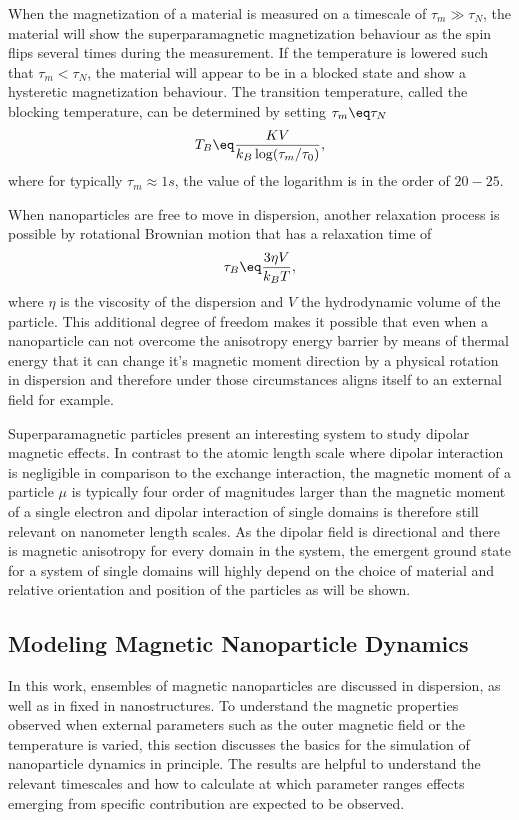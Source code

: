 \documentclass[\main/dresen_thesis.tex]{subfiles}
\begin{document}
    When the magnetization of a material is measured on a timescale of $\tau_m \gg \tau_N$, the material will show the superparamagnetic magnetization behaviour as the spin flips several times during the measurement.
    If the temperature is lowered such that $\tau_m < \tau_N$, the material will appear to be in a blocked state and show a hysteretic magnetization behaviour.
    The transition temperature, called the blocking temperature, can be determined by setting $\tau_m \eq \tau_N$
    \begin{align}
      T_B \eq \frac{KV}{k_B \log(\tau_m/\tau_0)},
    \end{align}
    where for typically $\tau_m \approx 1 \unit{s}$, the value of the logarithm is in the order of $20 - 25$.

    When nanoparticles are free to move in dispersion, another relaxation process is possible by rotational Brownian motion that has a relaxation time of \cite{Einstein_1956_Inves}
    \begin{align}
      \tau_B \eq \frac{3 \eta V}{k_B T},
    \end{align}
    where $\eta$ is the viscosity of the dispersion and $V$ the hydrodynamic volume of the particle.
    This additional degree of freedom makes it possible that even when a nanoparticle can not overcome the anisotropy energy barrier by means of thermal energy that it can change it's magnetic moment direction by a physical rotation in dispersion and therefore under those circumstances aligns itself to an external field for example.

    Superparamagnetic particles present an interesting system to study dipolar magnetic effects.
    In contrast to the atomic length scale where dipolar interaction is negligible in comparison to the exchange interaction, the magnetic moment of a particle $\mu$ is typically four order of magnitudes larger than the magnetic moment of a single electron and dipolar interaction of single domains is therefore still relevant on nanometer length scales.
    As the dipolar field is directional and there is magnetic anisotropy for every domain in the system, the emergent ground state for a system of single domains will highly depend on the choice of material and relative orientation and position of the particles as will be shown.

  \subsection{Modeling Magnetic Nanoparticle Dynamics}
    In this work, ensembles of magnetic nanoparticles are discussed in dispersion, as well as in fixed in nanostructures.
    To understand the magnetic properties observed when external parameters such as the outer magnetic field or the temperature is varied, this section discusses the basics for the simulation of nanoparticle dynamics in principle.
    The results are helpful to understand the relevant timescales and how to calculate at which parameter ranges effects emerging from specific contribution are expected to be observed.
\end{document}
